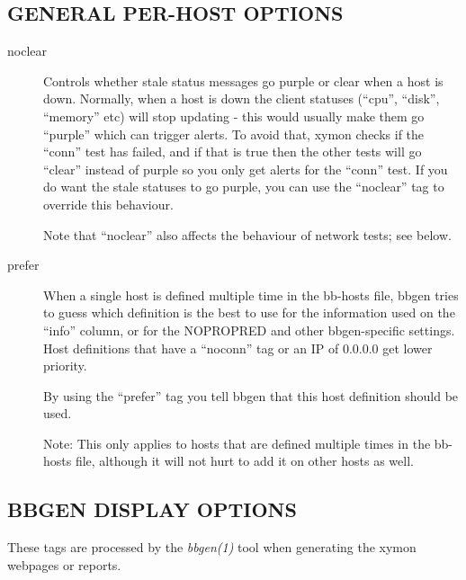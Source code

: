 \subsection{GENERAL PER-HOST OPTIONS }
\begin{description}
\item[noclear] Controls whether stale status messages go purple or
  clear when a host is down. Normally, when a host is down the client
  statuses (``cpu'', ``disk'', ``memory'' etc) will stop updating -
  this would usually make them go ``purple'' which can trigger
  alerts. To avoid that, xymon checks if the ``conn'' test has
  failed, and if that is true then the other tests will go ``clear''
  instead of purple so you only get alerts for the ``conn'' test. If
  you do want the stale statuses to go purple, you can use the
  ``noclear'' tag to override this behaviour. 


  Note that ``noclear'' also affects the behaviour of network tests; see below. 


 

\item[prefer] When a single host is defined multiple time in the
  bb-hosts file, bbgen tries to guess which definition is the best to
  use for the information used on the ``info'' column, or for the
  NOPROPRED and other bbgen-specific settings. Host definitions that
  have a ``noconn'' tag or an IP of 0.0.0.0 get lower priority. 


  By using the ``prefer'' tag you tell bbgen that this host definition should be used. 


  Note: This only applies to hosts that are defined multiple times in
  the bb-hosts file, although it will not hurt to add it on other
  hosts as well. 



 
\end{description}
\subsection{BBGEN DISPLAY OPTIONS}
 These tags are processed by the \emph{bbgen(1)}
 tool when generating the xymon webpages or reports. 

